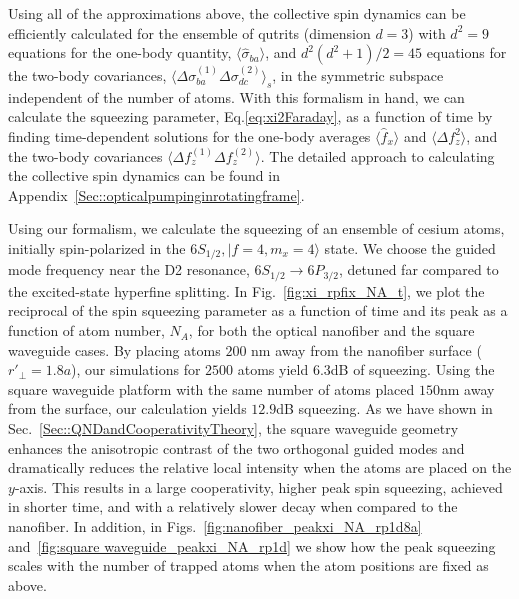 \documentclass[preprint,aps,pra,onecolumn,superscriptaddress]{revtex4-1} %
\def\ket#1{\lvert{#1}\rangle}%
\newcommand{\expect}[1]{\big\langle #1 \big\rangle}
\begin{document}
Using all of the approximations above, the collective spin dynamics can be efficiently calculated for the ensemble of qutrits (dimension  $d=3$) with $ d^2=9 $ equations for the one-body quantity, $ \expect{\hat{\sigma}_{ba}} $, and $ d^2(d^2+1)/2=45 $ equations for the two-body covariances, $ \expect{\Delta \sigma_{ba}^{(1)}\Delta\sigma_{dc}^{(2)} }_s $, in the symmetric subspace independent of the number of atoms.  With this formalism in hand, we can calculate the squeezing parameter, Eq.\eqref{eq:xi2Faraday}, as a function of time by finding time-dependent solutions for the one-body averages $\expect{\hat{f}_x}$ and  $\expect{\Delta f_z^2}$, and the two-body covariances $\expect{\Delta f_z^{(1)} \Delta f_z^{(2)}}$.  The detailed approach to calculating the collective spin dynamics can be found in Appendix~\ref{Sec::opticalpumpinginrotatingframe}. 

Using our formalism, we calculate the squeezing of an ensemble of cesium atoms, initially spin-polarized in the $6S_{1/2},\ket{f=4, m_x=4}$ state.  We choose the guided mode frequency near the D2 resonance, $6S_{1/2}\rightarrow 6P_{3/2}$, detuned far compared to the excited-state hyperfine splitting. In Fig.~\ref{fig:xi_rpfix_NA_t}, we plot the reciprocal of the spin squeezing parameter as a function of time and its peak as a function of atom number, $ N_A $, for both the optical nanofiber and the square waveguide cases. By placing atoms $ 200$ nm away from the nanofiber surface ($ r'\!_\perp=1.8a $), our simulations for $ 2500 $ atoms yield $ 6.3 $dB of squeezing. Using the square waveguide platform with the same number of atoms placed $150 $nm away from the surface, our calculation yields $12.9$dB squeezing. As we have shown in Sec.~\ref{Sec::QNDandCooperativityTheory}, the square waveguide geometry enhances the anisotropic contrast of the two orthogonal guided modes and dramatically reduces the relative local intensity when the atoms are placed on the $ y $-axis. This results in a large cooperativity, higher peak spin squeezing, achieved in shorter time, and with a relatively slower decay when compared to the nanofiber. 
In addition, in Figs.~\ref{fig:nanofiber_peakxi_NA_rp1d8a} and~\ref{fig:square waveguide_peakxi_NA_rp1d} we show how the peak squeezing scales with the number of trapped atoms when the atom positions are fixed as above. 
\end{document}
